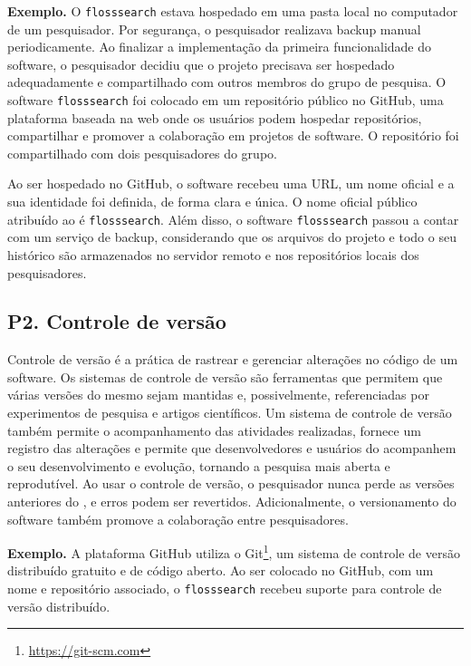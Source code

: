 \noindent \textbf{Exemplo.}
O \RSw \texttt{flosssearch} estava hospedado em uma pasta local no computador de um pesquisador. 
Por segurança, o pesquisador realizava backup manual periodicamente. 
Ao finalizar a implementação da primeira funcionalidade do software, o pesquisador decidiu que o projeto precisava ser hospedado adequadamente e compartilhado com outros membros do grupo de pesquisa.
O software \texttt{flosssearch} foi colocado em um repositório público no GitHub, uma plataforma baseada na web onde os usuários podem hospedar repositórios, compartilhar e promover a colaboração em projetos de software.
%
O repositório foi compartilhado com dois pesquisadores do grupo.

Ao ser hospedado no GitHub, o software recebeu uma URL, um nome oficial e a sua identidade foi definida, de forma clara e única. 
O nome oficial público atribuído ao \RSw é \texttt{flosssearch}.
Além disso, o software \texttt{flosssearch} passou a contar com um serviço de backup, considerando que os arquivos do projeto e todo o seu histórico são armazenados no servidor remoto e nos repositórios locais dos pesquisadores.

\subsection*{P2. Controle de versão} 

Controle de versão é a prática de rastrear e gerenciar alterações no código de um software. 
Os sistemas de controle de versão são ferramentas que
permitem que várias versões do mesmo \RSw sejam mantidas e, possivelmente, referenciadas por experimentos de pesquisa e artigos científicos. 
Um sistema de controle de versão também permite o acompanhamento das atividades realizadas, fornece um registro das alterações e permite que desenvolvedores e usuários do \RSw acompanhem o seu desenvolvimento e evolução, tornando a pesquisa mais aberta
e reprodutível. 
Ao usar o controle de versão, o pesquisador nunca perde as versões anteriores do \RS, e erros podem ser revertidos.
Adicionalmente, o versionamento do software também promove a colaboração entre pesquisadores.


\noindent \textbf{Exemplo.}
A plataforma GitHub utiliza o Git\footnote{\url{https://git-scm.com}}, um sistema de controle de versão distribuído gratuito e de código aberto. 
Ao ser colocado no GitHub, com um nome e repositório associado, 
o \RSw \texttt{flosssearch} recebeu suporte para controle de versão distribuído. 

